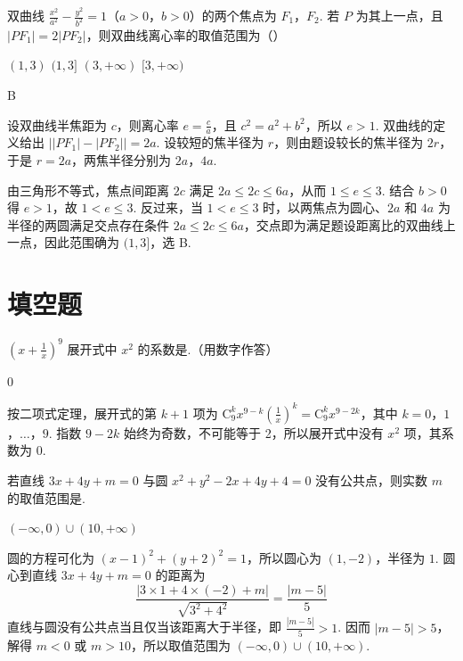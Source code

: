 \begin{problem}
双曲线 \(\frac{x^2}{a^2} - \frac{y^2}{b^2} = 1\)（\(a > 0\)，\(b > 0\)）的两个焦点为 \(F_1\)，\(F_2\). 若 \(P\) 为其上一点，且 \(|PF_1| = 2|PF_2|\)，则双曲线离心率的取值范围为（\quad）

\choices
    {\((1,3)\)}
    {\((1,3]\)}
    {\((3, +\infty)\)}
    {\([3, +\infty)\)}

\begin{answer}
B
\end{answer}

\begin{solution}
设双曲线半焦距为 \(c\)，则离心率 \(e=\frac ca\)，且 \(c^2=a^2+b^2\)，所以 \(e>1\). 双曲线的定义给出 \(\left||PF_1|-|PF_2|\right|=2a\). 设较短的焦半径为 \(r\)，则由题设较长的焦半径为 \(2r\)，于是 \(r=2a\)，两焦半径分别为 \(2a\)，\(4a\).

由三角形不等式，焦点间距离 \(2c\) 满足 \(2a\leqslant2c\leqslant6a\)，从而 \(1\leqslant e\leqslant3\). 结合 \(b>0\) 得 \(e>1\)，故 \(1<e\leqslant3\). 反过来，当 \(1<e\leqslant3\) 时，以两焦点为圆心、\(2a\) 和 \(4a\) 为半径的两圆满足交点存在条件 \(2a\leqslant2c\leqslant6a\)，交点即为满足题设距离比的双曲线上一点，因此范围确为 \((1,3]\)，选 B.
\end{solution}
\end{problem}

\section{填空题}

\begin{problem}
\(\left(x + \frac{1}{x}\right)^9\) 展开式中 \(x^2\) 的系数是\fillinblank{}.（用数字作答）

\begin{answer}
\(0\)
\end{answer}

\begin{solution}
按二项式定理，展开式的第 \(k+1\) 项为 \(\mathrm C_9^k x^{9-k}\left(\frac1x\right)^k=\mathrm C_9^k x^{9-2k}\)，其中 \(k=0\)，\(1\)，\(\ldots\)，\(9\). 指数 \(9-2k\) 始终为奇数，不可能等于 2，所以展开式中没有 \(x^2\) 项，其系数为 \(0\).
\end{solution}
\end{problem}

\begin{problem}
若直线 \(3x + 4y + m = 0\) 与圆 \(x^{2} + y^{2} - 2x + 4y + 4 = 0\) 没有公共点，则实数 \(m\) 的取值范围是\fillinblank{}.

\begin{answer}
\((-\infty,0)\cup(10,+\infty)\)
\end{answer}

\begin{solution}
圆的方程可化为 \((x-1)^2+(y+2)^2=1\)，所以圆心为 \((1,-2)\)，半径为 \(1\). 圆心到直线 \(3x+4y+m=0\) 的距离为
\[
\frac{|3\times1+4\times(-2)+m|}{\sqrt{3^2+4^2}}=\frac{|m-5|}{5}
\]
直线与圆没有公共点当且仅当该距离大于半径，即 \(\frac{|m-5|}{5}>1\). 因而 \(|m-5|>5\)，解得 \(m<0\) 或 \(m>10\)，所以取值范围为 \((-\infty,0)\cup(10,+\infty)\).
\end{solution}
\end{problem}

